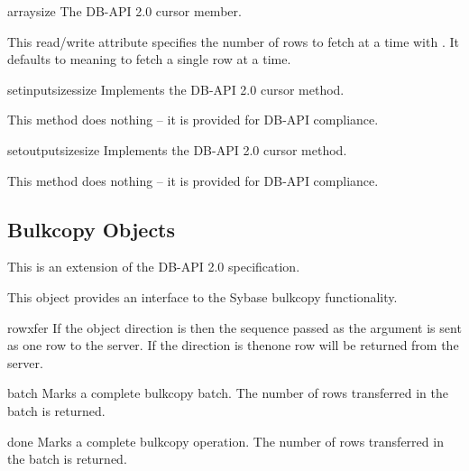 \begin{memberdesc}[Cursor]{arraysize}
The DB-API 2.0 cursor  member.

This read/write attribute specifies the number of rows to fetch at a
time with .  It defaults to  meaning to
fetch a single row at a time.
\end{memberdesc}

\begin{methoddesc}[Cursor]{setinputsizes}{size}
Implements the DB-API 2.0 cursor  method.

This method does nothing -- it is provided for DB-API compliance.
\end{methoddesc}

\begin{methoddesc}[Cursor]{setoutputsize}{size }
Implements the DB-API 2.0 cursor  method.

This method does nothing -- it is provided for DB-API compliance.
\end{methoddesc}

\subsection{Bulkcopy Objects}

This is an extension of the DB-API 2.0 specification.

This object provides an interface to the Sybase bulkcopy
functionality.

\begin{methoddesc}[Bulkcopy]{rowxfer}{}
If the  object direction is  then the
sequence passed as the  argument is sent as one row to the
server.  If the direction is  thenone row will be
returned from the server.
\end{methoddesc}

\begin{methoddesc}[Bulkcopy]{batch}{}
Marks a complete bulkcopy batch.  The number of rows transferred in
the batch is returned.
\end{methoddesc}

\begin{methoddesc}[Bulkcopy]{done}{}
Marks a complete bulkcopy operation.  The number of rows transferred
in the batch is returned.
\end{methoddesc}

